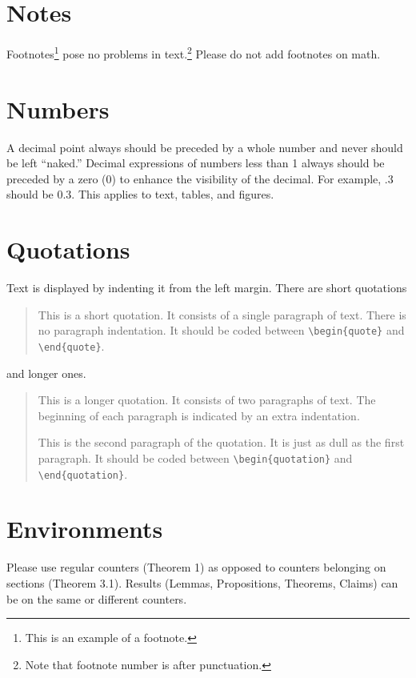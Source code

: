 \documentclass[ecta,nameyear,draft]{econsocart}
\theoremstyle{plain}
\theoremstyle{remark}
\begin{document}
\section{Notes}
Footnotes\footnote{This is an example of a footnote.}
pose no problems in text.\footnote{Note that footnote number is after punctuation.} Please do not add footnotes on math. 

\section{Numbers}
A decimal point always should be preceded by a whole number and never should be left ``naked.'' Decimal expressions of numbers less than 1 always should be preceded by a zero (0) to enhance the visibility of the decimal. For example, .3 should be 0.3.   This applies to text, tables, and figures.

\section{Quotations}

Text is displayed by indenting it from the left margin. There are short quotations
\begin{quote}
This is a short quotation.  It consists of a
single paragraph of text.  There is no paragraph
indentation. It should be coded between \verb|\begin{quote}| and \verb|\end{quote}|.
\end{quote}
and longer ones.
\begin{quotation}
This is a longer quotation.  It consists of two paragraphs
of text.  The beginning of each paragraph is indicated
by an extra indentation.

This is the second paragraph of the quotation.  It is just
as dull as the first paragraph. It should be coded between \verb|\begin{quotation}| and \verb|\end{quotation}|.
\end{quotation}

\section{Environments}

Please use regular counters (Theorem 1) as opposed to counters belonging on sections (Theorem 3.1). Results (Lemmas, Propositions, Theorems, Claims) can be on the same or different counters.
\end{document}
